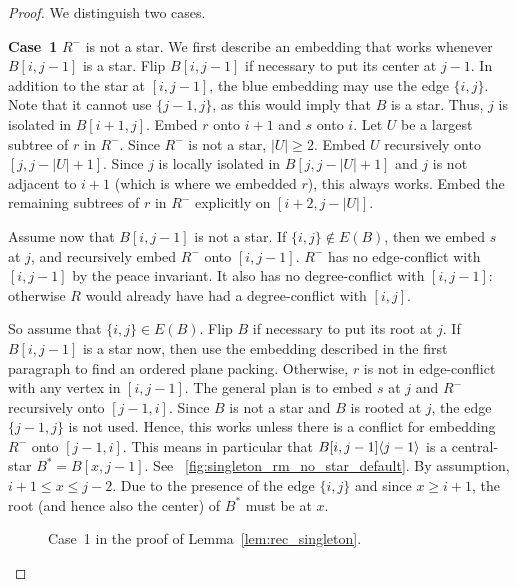 \documentclass[11pt,a4paper,colorlinks=true,urlcolor=blue,citecolor=red]{article}
\theoremstyle{plain}
\newcommand{\case}[1]{\par\vspace{.5\baselineskip}\noindent\textbf{\sffamily Case~#1}}
\begin{document}
\begin{proof}
  We distinguish two cases.

  \case{1} $R^-$ is not a star. We first describe an embedding that
  works whenever $B[i,j-1]$ is a star. Flip $B[i,j-1]$ if necessary to
  put its center at $j-1$. In addition to the star at $[i,j-1]$, the
  blue embedding may use the edge $\{i,j\}$. Note that it cannot use
  $\{j-1,j\}$, as this would imply that $B$ is a star. Thus, $j$ is
  isolated in $B[i+1,j]$. Embed $r$ onto $i+1$ and $s$ onto $i$. Let $U$
  be a largest subtree of $r$ in $R^-$. Since $R^-$ is not a star,
  $|U|\geq 2$. Embed $U$ recursively onto $[j,j-|U|+1]$. Since $j$ is
  locally isolated in $B[j,j-|U|+1]$ and $j$ is not adjacent to $i+1$
  (which is where we embedded $r$), this always works. Embed the
  remaining subtrees of $r$ in $R^-$ explicitly on $[i+2,j-|U|]$.

  Assume now that $B[i,j-1]$ is not a star.
  If $\{i,j\}\not\in E(B)$, then we embed $s$ at $j$, and recursively
  embed $R^-$ onto $[i,j-1]$.
$R^-$ has no edge-conflict with $[i,j-1]$ by the peace invariant.
  It also has no degree-conflict with $[i,j-1]$:
  otherwise $R$ would already have had a degree-conflict with $[i,j]$.

  So assume that $\{i,j\}\in E(B)$. Flip $B$ if necessary to put
  its root at $j$. If $B[i,j-1]$ is a star now, then use the embedding
  described in the first paragraph to find an ordered plane packing.
  Otherwise, $r$ is not in edge-conflict with any vertex in $[i,j-1]$.
  The general plan is to embed $s$ at $j$ and $R^-$ recursively onto
  $[j-1,i]$. Since $B$ is not a star and $B$ is rooted at $j$, the edge
  $\{j-1,j\}$ is not used. Hence, this works unless there is a
  conflict for embedding $R^-$ onto $[j-1,i]$. This means in
  particular that $B{[i,j-1]}\langle{j-1}\rangle$ is a central-star
  $B^*=B[x,j-1]$. See
  \figurename~\ref{fig:singleton_rm_no_star_default}. By assumption,
  $i+1\leq x\leq j-2$. Due to the presence of the edge $\{i,j\}$ and
  since $x\geq i+1$, the root (and hence also the center) of $B^*$ must
  be at $x$.

  \begin{figure}[b]
    \centering\hfil {}\hfil {}\hfil {}\hfil {}\hfil \caption{Case~1 in the proof of Lemma~\ref{lem:rec_singleton}.}
  \end{figure}


\end{proof}
\end{document}
